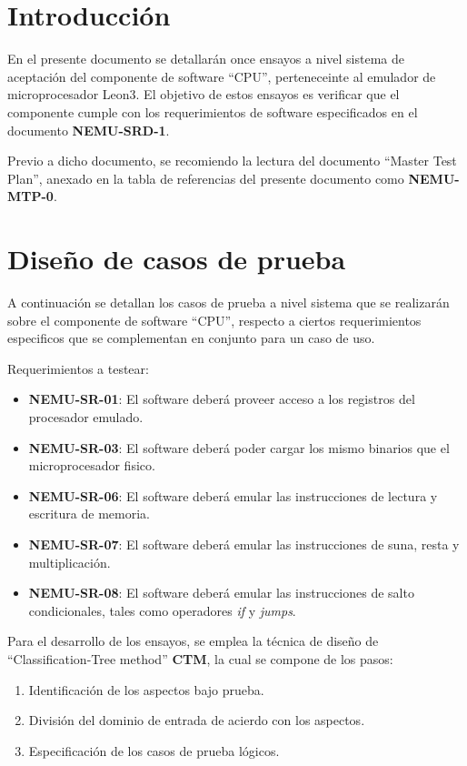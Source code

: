 \documentclass[
  11pt, %
  codirector, %
]{charter}
\begin{document}
\pagebreak


\section{Introducción}
\label{sec:org60390fa}

En el presente documento se detallarán once ensayos a nivel sistema de aceptación del componente de software ``CPU'', perteneceinte al emulador de microprocesador Leon3. El objetivo de estos ensayos es verificar que el componente cumple con los requerimientos de software especificados en el documento \textbf{NEMU-SRD-1}.

Previo a dicho documento, se recomiendo la lectura del documento ``Master Test Plan'', anexado en la tabla de referencias del presente documento como \textbf{NEMU-MTP-0}.


\section{Diseño de casos de prueba}
\label{sec:org12376an}

A continuación se detallan los casos de prueba a nivel sistema que se realizarán sobre el componente de software ``CPU'', respecto a ciertos requerimientos especificos que se complementan en conjunto para un caso de uso.

Requerimientos a testear:

\begin{itemize}
\item \textbf{NEMU-SR-01}: El software deberá proveer acceso a los registros del procesador emulado.
\item \textbf{NEMU-SR-03}: El software deberá poder cargar los mismo binarios que el microprocesador fisico.
\item \textbf{NEMU-SR-06}: El software deberá emular las instrucciones de lectura y escritura de memoria.
\item \textbf{NEMU-SR-07}: El software deberá emular las instrucciones de suna, resta y multiplicación.
\item \textbf{NEMU-SR-08}: El software deberá emular las instrucciones de salto condicionales, tales como operadores \textit{if} y \textit{jumps}.
\end{itemize}

Para el desarrollo de los ensayos, se emplea la técnica de diseño de ``Classification-Tree method'' \textbf{CTM}, la cual se compone de los pasos:
\begin{enumerate}
\item Identificación de los aspectos bajo prueba.
\item División del dominio de entrada de acierdo con los aspectos.
\item Especificación de los casos de prueba lógicos.
\end{enumerate}
\end{document}
